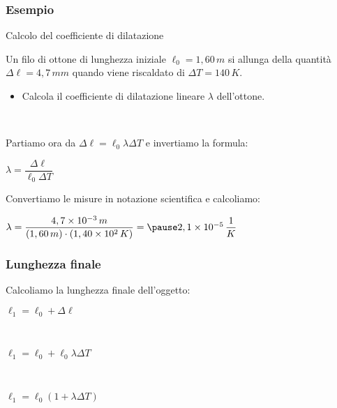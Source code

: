 \documentclass[]{beamer}
\theoremstyle{plain}
\begin{document}
\begin{frame}
\frametitle{Esempio}
\begin{exampleblock}{Calcolo del coefficiente di dilatazione}
{\small Un filo di ottone di lunghezza iniziale $ \ell_0 = 1,60 \, m $ si allunga della quantità $ \Delta\ell = 4,7 \, mm $ quando viene riscaldato di $ \Delta T = 140 \, K $.
\begin{itemize}
  \item Calcola il coefficiente di dilatazione lineare $ \lambda $ dell'ottone.
\end{itemize}}
\end{exampleblock}\pause

~

Partiamo ora da $ \Delta \ell = \ell_0 \lambda \Delta T $ e invertiamo la formula:
\begin{center}
$ \lambda = \dfrac{\Delta\ell}{\ell_0 \Delta T} $
\end{center}\pause

Convertiamo le misure in notazione scientifica e calcoliamo:
\begin{center}
$ \lambda = \dfrac{4,7 \times 10^{-3}\, m}{(1,60 \, m)\cdot(1,40 \times 10^2 \, K)} =\pause 2,1 \times10^{-5} \, \dfrac{1}{K} $
\end{center}
\end{frame}



\begin{frame}
\frametitle{Lunghezza finale}
Calcoliamo la lunghezza finale dell'oggetto:
\begin{center}
$ \ell_1 = \ell_0 + \Delta \ell $

~

$ \ell_1 = \ell_0 + \ell_0 \lambda \Delta T $

~

\colorbox{blue!30}{$ \ell_1 = \ell_0 ( 1 + \lambda \Delta T ) $}
\end{center}
\end{frame}
\end{document}

